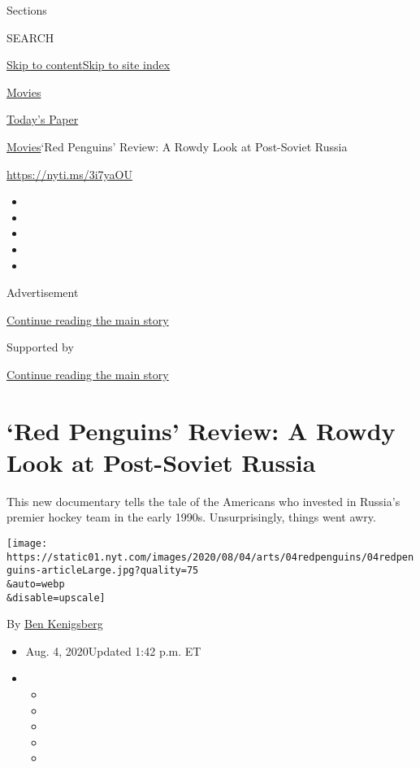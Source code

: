 Sections

SEARCH

\protect\hyperlink{site-content}{Skip to
content}\protect\hyperlink{site-index}{Skip to site index}

\href{https://www.nytimes.com/section/movies}{Movies}

\href{https://myaccount.nytimes.com/auth/login?response_type=cookie\&client_id=vi}{}

\href{https://www.nytimes.com/section/todayspaper}{Today's Paper}

\href{/section/movies}{Movies}\textbar{}`Red Penguins' Review: A Rowdy
Look at Post-Soviet Russia

\url{https://nyti.ms/3i7yaOU}

\begin{itemize}
\item
\item
\item
\item
\item
\end{itemize}

Advertisement

\protect\hyperlink{after-top}{Continue reading the main story}

Supported by

\protect\hyperlink{after-sponsor}{Continue reading the main story}

\hypertarget{red-penguins-review-a-rowdy-look-at-post-soviet-russia}{%
\section{`Red Penguins' Review: A Rowdy Look at Post-Soviet
Russia}\label{red-penguins-review-a-rowdy-look-at-post-soviet-russia}}

This new documentary tells the tale of the Americans who invested in
Russia's premier hockey team in the early 1990s. Unsurprisingly, things
went awry.

\texttt{[image: https://static01.nyt.com/images/2020/08/04/arts/04redpenguins/04redpenguins-articleLarge.jpg?quality=75\\\&auto=webp\\\&disable=upscale]}

By \href{https://www.nytimes.com/by/ben-kenigsberg}{Ben Kenigsberg}

\begin{itemize}
\item
  Aug. 4, 2020Updated 1:42 p.m. ET
\item
  \begin{itemize}
  \item
  \item
  \item
  \item
  \item
  \end{itemize}
\end{itemize}

